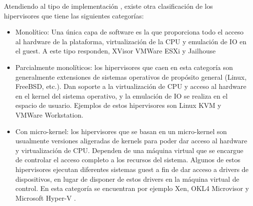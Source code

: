 Atendiendo al tipo de implementación , existe otra clasificación de los hipervisores \cite{xvisor} que tiene las siguientes categorías:
\begin{itemize}
	\item Monolítico: Una única capa de software es la que proporciona todo el acceso al hardware de la plataforma, virtualización de la CPU y emulación de IO en el guest. A este tipo responden, XVisor VMWare ESXi \cite{vmware} y Jailhouse \cite{jailhouse_github}
	\item Parcialmente monolíticos: los hipervisores que caen en esta categoría son generalmente extensiones de sistemas operativos de propósito general (Linux, FreeBSD, etc.). Dan soporte a la virtualización de CPU y acceso al hardware en el kernel del sistema operativo, y la emulación de IO se realiza en el espacio de usuario. Ejemplos de estos hipervisores son Linux KVM y VMWare Workstation.
	\item Con micro-kernel: los hipervisores que se basan en un micro-kernel son usualmente versiones aligeradas de kernels para poder dar acceso al hardware y virtualización de CPU. Dependen de una máquina virtual que se encargue de controlar el acceso completo a los recursos del sistema. Algunos de estos hipervisores ejecutan diferentes sistemas guest a fin de dar acceso a drivers de dispositivos, en lugar de disponer de estos drivers en la máquina virtual de control. En esta categoría se encuentran por ejemplo Xen, OKL4 Microvisor \cite{okl4} y Microsoft Hyper-V \cite{hyper-v}.
\end{itemize}

\newpage
